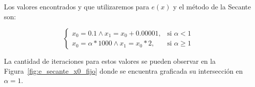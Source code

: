 Los valores encontrados y que utilizaremos para $e(x)$ y el método de la
Secante son:

\[
\begin{cases}
x_0 = 0.1 \wedge x_1 = x_0 + 0.00001, & \mbox{si } \alpha < 1\\
x_0 = \alpha * 1000 \wedge x_1 = x_0 * 2, & \mbox{si } \alpha \ge 1
\end{cases}
\]

La cantidad de iteraciones para estos valores se pueden observar en la
Figura~\ref{fig:e_secante_x0_fijo} donde se encuentra graficada su intersección
en $\alpha = 1$.
